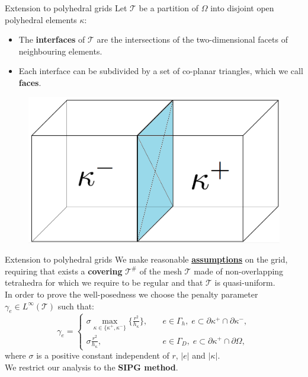 \documentclass{beamer}
\begin{document}
\begin{frame}{Extension to polyhedral grids}
	Let $\mathcal{T}$ be a partition of	$\Omega$ into disjoint open
	polyhedral elements $\kappa$:
	\begin{itemize}
		\item The \textbf{interfaces} of $\mathcal{T}$ are the intersections of
		the two-dimensional facets of neighbouring elements.
		\item Each interface can be subdivided by a set of co-planar triangles,
		which we call \textbf{faces}.
	\end{itemize}
	\begin{figure}
		\centering
		\includegraphics[scale=0.2]{elements}
	\end{figure}
\end{frame}
\begin{frame}[label=main]{Extension to polyhedral grids}
	We make reasonable
	\hyperlink{supplemental}{\textbf{assumptions}} on the grid, requiring that
	exists a
	\textbf{covering} $\mathcal{T}^\#$ of the mesh $\mathcal{T}$ made of
	non-overlapping
	tetrahedra for which we require to be regular and that $\mathcal{T}$ is
	quasi-uniform.\\
	\vspace*{0.5cm}
	In order to prove the well-posedness we choose the penalty parameter
	$\gamma_e \in L^\infty(\mathcal{T})$ such that:
	\begin{equation*} \label{eq:penalty}
	\gamma_e =
	\begin{cases}
	\sigma \max\limits_{\kappa \in \{\kappa^+, \kappa^-\}} \big\{
	\frac{r^2}{h_\kappa}\big\},
	& \quad e \in \Gamma_h, \; e \subset \partial\kappa^+ \cap
	\partial\kappa^-,\\
	\sigma\frac{r^2}{h_\kappa},& \quad e \in \Gamma_D, \; e \subset
	\partial\kappa^+ \cap \partial\Omega,
	\end{cases}
	\end{equation*}
	where $\sigma$ is a positive constant independent of $r$, $|e|$ and
	$|\kappa|$.\\
	We restrict our analysis to the \textbf{SIPG method}.
\end{frame}
\end{document}
